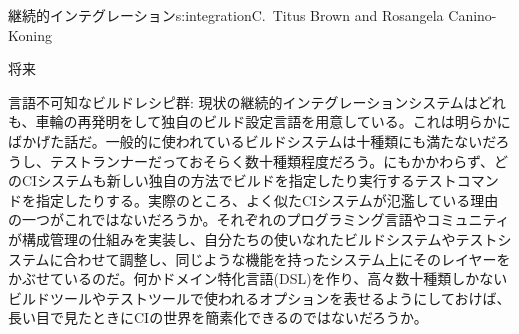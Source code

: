 \begin{aosachapter}{継続的インテグレーション}{s:integration}{C.\ Titus Brown and Rosangela Canino-Koning}
\begin{aosasect1}{将来}
\begin{aosadescription}
  \item{言語不可知なビルドレシピ群:} 現状の継続的インテグレーションシステムはどれも、車輪の再発明をして独自のビルド設定言語を用意している。これは明らかにばかげた話だ。一般的に使われているビルドシステムは十種類にも満たないだろうし、テストランナーだっておそらく数十種類程度だろう。にもかかわらず、どのCIシステムも新しい独自の方法でビルドを指定したり実行するテストコマンドを指定したりする。実際のところ、よく似たCIシステムが氾濫している理由の一つがこれではないだろうか。それぞれのプログラミング言語やコミュニティが構成管理の仕組みを実装し、自分たちの使いなれたビルドシステムやテストシステムに合わせて調整し、同じような機能を持ったシステム上にそのレイヤーをかぶせているのだ。何かドメイン特化言語(DSL)を作り、高々数十種類しかないビルドツールやテストツールで使われるオプションを表せるようにしておけば、長い目で見たときにCIの世界を簡素化できるのではないだろうか。


\end{aosadescription}
\end{aosasect1}
\end{aosachapter}

